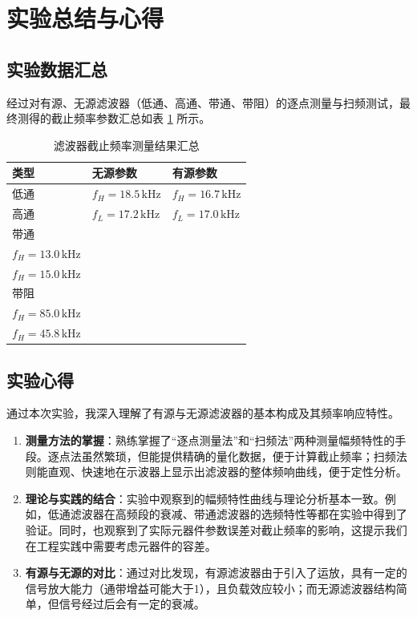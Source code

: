 \documentclass[12pt, a4paper]{ctexrep}
\begin{document}
\section{实验总结与心得}

\subsection{实验数据汇总}

经过对有源、无源滤波器（低通、高通、带通、带阻）的逐点测量与扫频测试，最终测得的截止频率参数汇总如表 \ref{tab:final_result} 所示。

\begin{table}[H]
    \centering
    \renewcommand{\arraystretch}{1.5}
    \setlength{\tabcolsep}{8pt}
    \begin{tabular}{|l|l|l|}
        \hline
        \textbf{类型} & \textbf{无源参数} & \textbf{有源参数} \\
        \hline
        低通 & $f_H = 18.5\,\mathrm{kHz}$ & $f_H = 16.7\,\mathrm{kHz}$ \\
        高通 & $f_L = 17.2\,\mathrm{kHz}$ & $f_L = 17.0\,\mathrm{kHz}$ \\
        \hline
        带通 & \makecell[l]{$f_L = 2.1\,\mathrm{kHz}$ \\ $f_H = 13.0\,\mathrm{kHz}$} &
               \makecell[l]{$f_L = 3.8\,\mathrm{kHz}$ \\ $f_H = 15.0\,\mathrm{kHz}$} \\
        \hline
        带阻 & \makecell[l]{$f_L = 3.6\,\mathrm{kHz}$ \\ $f_H = 85.0\,\mathrm{kHz}$} &
               \makecell[l]{$f_L = 6.5\,\mathrm{kHz}$ \\ $f_H = 45.8\,\mathrm{kHz}$} \\
        \hline
    \end{tabular}
    \caption{滤波器截止频率测量结果汇总}
    \label{tab:final_result}
\end{table}


\subsection{实验心得}

通过本次实验，我深入理解了有源与无源滤波器的基本构成及其频率响应特性。
\begin{enumerate}
    \item \textbf{测量方法的掌握}：熟练掌握了“逐点测量法”和“扫频法”两种测量幅频特性的手段。逐点法虽然繁琐，但能提供精确的量化数据，便于计算截止频率；扫频法则能直观、快速地在示波器上显示出滤波器的整体频响曲线，便于定性分析。
    \item \textbf{理论与实践的结合}：实验中观察到的幅频特性曲线与理论分析基本一致。例如，低通滤波器在高频段的衰减、带通滤波器的选频特性等都在实验中得到了验证。同时，也观察到了实际元器件参数误差对截止频率的影响，这提示我们在工程实践中需要考虑元器件的容差。
    \item \textbf{有源与无源的对比}：通过对比发现，有源滤波器由于引入了运放，具有一定的信号放大能力（通带增益可能大于1），且负载效应较小；而无源滤波器结构简单，但信号经过后会有一定的衰减。
\end{enumerate}
\end{document}
